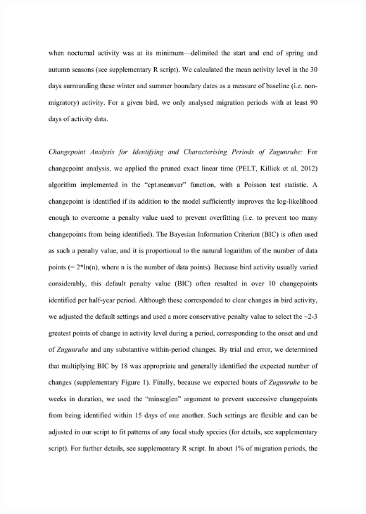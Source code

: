 \documentclass[a4paper, twoside]{templates/ociamthesis}
\begin{document}
\includegraphics[width=1\linewidth]{pdf_chapters/zug/zug_supp_crop_Part5}
\end{document}
